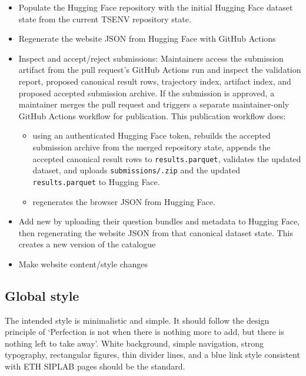 \documentclass[11pt]{article}
\begin{document}
\begin{itemize}
  \item Populate the Hugging Face repository  with the initial Hugging Face dataset state from the current TSENV repository state.
  \item Regenerate the website JSON from Hugging Face with GitHub Actions  
  \item {}\label{sec:website-admin-review-submissions}Inspect and accept/reject submissions: Maintainers access the submission artifact from the pull request's GitHub Actions run and inspect the validation report, proposed canonical result rows, trajectory index, artifact index, and proposed accepted submission archive.
  If the submission is approved, a maintainer merges the pull request and triggers a separate maintainer-only GitHub Actions workflow for publication.
  This publication workflow  does:
  \begin{itemize}
    \item using an authenticated Hugging Face token, rebuilds the accepted submission archive from the merged repository state, appends the accepted canonical result rows to \texttt{results.parquet}, validates the updated dataset, and uploads \texttt{submissions/.zip} and the updated \texttt{results.parquet} to Hugging Face.
    \item regenerates the browser JSON from Hugging Face. 
  \end{itemize}
  \item Add new \termSimulators by uploading their question bundles and metadata to Hugging Face, then regenerating the website JSON from that canonical dataset state.
  This creates a new version of the catalogue
  \item Make website content/style changes 
\end{itemize}


\label{sec:website-global-style}
\subsection*{Global style}

The intended style is minimalistic and simple. 
It should follow the design principle of `Perfection is not when there is nothing more to add, but there is nothing left to take away'.
White background, simple navigation, strong typography, rectangular figures, thin divider lines, and a blue link style consistent with ETH SIPLAB pages should be the standard.
\end{document}
